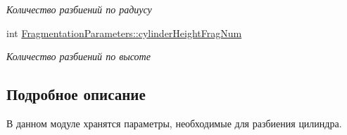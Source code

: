 \begin{DoxyCompactItemize}
\begin{DoxyCompactList}\small\item\em Количество разбиений по радиусу \end{DoxyCompactList}\item 
\mbox{\label{group__cylinder_parameters_gafa21e09152b4d7c81b6526392c8e18ca}} 
int \mbox{\hyperlink{group__cylinder_parameters_gafa21e09152b4d7c81b6526392c8e18ca}{Fragmentation\+Parameters\+::cylinder\+Height\+Frag\+Num}}
\begin{DoxyCompactList}\small\item\em Количество разбиений по высоте \end{DoxyCompactList}\end{DoxyCompactItemize}


\subsection{Подробное описание}
В данном модуле хранятся параметры, необходимые для разбиения цилиндра. 

